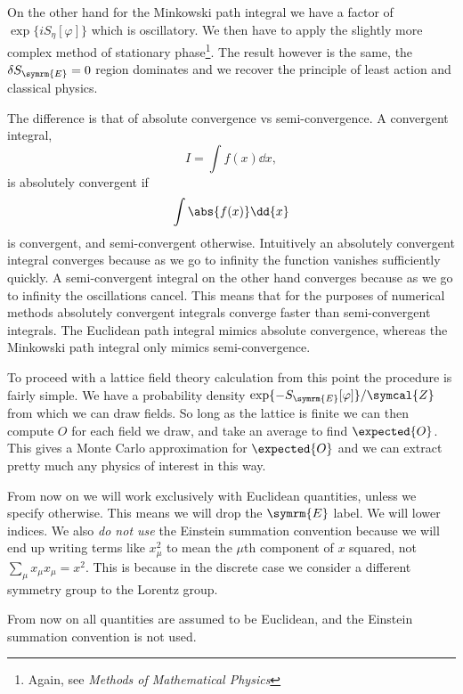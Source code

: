 \documentclass[fleqn]{NotesClass}
\newcommand*{\course}[1]{\textit{#1}}
\newcommand{\minkowskiMetric}{\eta}
\newcommand{\euclidean}{\symrm{E}}
\newcommand{\partitionFunction}{\symcal{Z}}
\begin{document}
    On the other hand for the Minkowski path integral we have a factor of \(\exp\{iS_{\minkowskiMetric}[\varphi]\}\) which is oscillatory.
    We then have to apply the slightly more complex method of stationary phase\footnote{Again, see \course{Methods of Mathematical Physics}}.
    The result however is the same, the \(\delta S_{\euclidean} = 0\) region dominates and we recover the principle of least action and classical physics.
    
    The difference is that of absolute convergence vs semi-convergence.
    A convergent integral,
    \begin{equation}
        I = \int f(x) \dd{x},
    \end{equation}
    is absolutely convergent if
    \begin{equation}
        \int \abs{f(x)} \dd{x}
    \end{equation}
    is convergent, and semi-convergent otherwise.
    Intuitively an absolutely convergent integral converges because as we go to infinity the function vanishes sufficiently quickly.
    A semi-convergent integral on the other hand converges because as we go to infinity the oscillations cancel.
    This means that for the purposes of numerical methods absolutely convergent integrals converge faster than semi-convergent integrals.
    The Euclidean path integral mimics absolute convergence, whereas the Minkowski path integral only mimics semi-convergence.
    
    To proceed with a lattice field theory calculation from this point the procedure is fairly simple.
    We have a probability density \(\exp\{-S_{\euclidean}[\varphi]\}/\partitionFunction\) from which we can draw fields.
    So long as the lattice is finite we can then compute \(O\) for each field we draw, and take an average to find \(\expected{O}\).
    This gives a Monte Carlo approximation for \(\expected{O}\) and we can extract pretty much any physics of interest in this way.
    
    From now on we will work exclusively with Euclidean quantities, unless we specify otherwise.
    This means we will drop the \(\euclidean\) label.
    We will lower indices.
    We also \emph{do not use} the Einstein summation convention because we will end up writing terms like \(x_\mu^2\) to mean the \(\mu\)th component of \(x\) squared, not \(\sum_\mu x_\mu x_\mu = x^2\).
    This is because in the discrete case we consider a different symmetry group to the Lorentz group.
    
    \begin{wrn}
        From now on all quantities are assumed to be Euclidean, and the Einstein summation convention is not used.
    \end{wrn}
    
\end{document}

